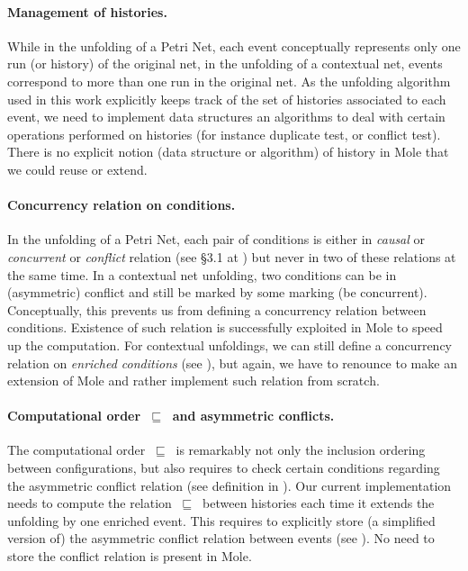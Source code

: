 \documentclass[11pt,a4paper]{article}
\newcommand{\evolves}{{\ensuremath{\ \sqsubseteq \ }}}
\begin{document}
\paragraph{Management of histories.}  While in the unfolding of a Petri Net,
each event conceptually represents only one run (or history) of the original
net, in the unfolding of a contextual net, events correspond to more than one
run in the original net.  As the unfolding algorithm used in this work
explicitly keeps track of the set of histories associated to each event, we
need to implement data structures an algorithms to deal with certain operations
performed on histories (for instance duplicate test, or conflict test).  There
is no explicit notion (data structure or algorithm) of history in Mole that we
could reuse or extend.

\paragraph{Concurrency relation on conditions.}  In the unfolding of a Petri
Net, each pair of conditions is either in \emph{causal} or \emph{concurrent} or
\emph{conflict} relation (see \S3.1 at ) but never in two of these
relations at the same time.  In a contextual net unfolding, two conditions can
be in (asymmetric) conflict and still be marked by some marking (be
concurrent).  Conceptually, this prevents us from defining a concurrency
relation between conditions.  Existence of such relation is successfully
exploited in Mole to speed up the computation.  For contextual unfoldings, we
can still define a concurrency relation on \emph{enriched conditions} (see
), but again, we have to renounce to make an extension of
Mole and rather implement such relation from scratch.

\paragraph{Computational order $\evolves$ and asymmetric conflicts.}  The
computational order $\evolves$ is remarkably not only the inclusion ordering
between configurations, but also requires to check certain conditions regarding
the asymmetric conflict relation (see definition in ).  Our
current implementation needs to compute the relation $\evolves$ between
histories each time it extends the unfolding by one enriched event.  This
requires to explicitly store (a simplified version of) the asymmetric conflict
relation between events (see ).  No need to store the
conflict relation is present in Mole.
\end{document}
